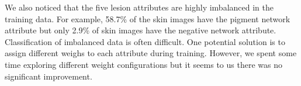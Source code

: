 \documentclass{article}
\begin{document}
We also noticed that the five lesion attributes are highly imbalanced in the training data. For example, 58.7\% of the skin images have the pigment network attribute but only 2.9\% of skin images have the negative network attribute. Classification of imbalanced data is often difficult. One potential solution is to assign different weighs to each attribute during training. However, we spent some time exploring different weight configurations but it seems to us there was no significant improvement. 






\end{document}
